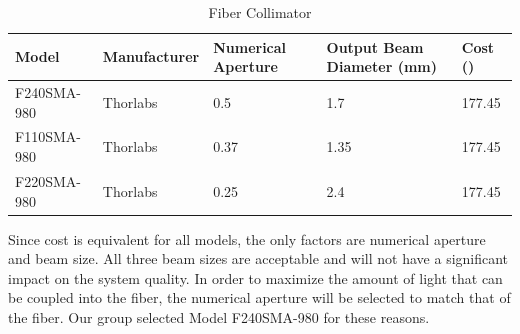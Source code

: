 \begin{table}[H]
	\centering
	\label{table:Fiber Collimator}
	\caption{Fiber Collimator}
	\bigskip
	\begin{tabular}{|p{2cm}|p{2.5cm}|p{2cm}|p{2.75cm}|p{1.75cm}|}
	\hline
	Model & Manufacturer & Numerical Aperture & Output Beam Diameter (mm) & Cost (\textdollar)\\
	\hline
	F240SMA-980 & Thorlabs & 0.5 & 1.7 & 177.45\\
	\hline
	F110SMA-980 & Thorlabs & 0.37 & 1.35 & 177.45\\
	\hline
	F220SMA-980 & Thorlabs & 0.25 & 2.4 & 177.45\\
	\hline
	\end{tabular}
\end{table}


Since cost is equivalent for all models, the only factors are numerical aperture and beam size. All three beam sizes are acceptable and will not have a significant impact on the system quality. In order to maximize the amount of light that can be coupled into the fiber, the numerical aperture will be selected to match that of the fiber. Our group selected Model F240SMA-980 for these reasons.

